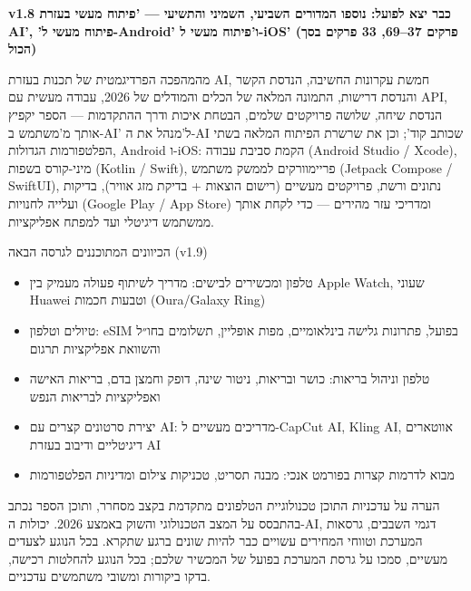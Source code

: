

\textbf{v1.8 כבר יצא לפועל: נוספו המדורים השביעי, השמיני והתשיעי — 'פיתוח מעשי בעזרת AI', 'פיתוח מעשי ל-Android' ו'פיתוח מעשי ל-iOS' (פרקים 37–69, 33 פרקים בסך הכול)}\par

מהמהפכה הפרדיגמטית של תכנות בעזרת AI, חמשת עקרונות החשיבה, הנדסת הקשר והנדסת דרישות, התמונה המלאה של הכלים והמודלים של 2026, עבודה מעשית עם API, הנדסת שיחה, שלושה פרויקטים שלמים, הבטחת איכות ודרך ההתקדמות — הספר יקפיץ אותך מ'משתמש ב-AI' ל'מנהל את ה-AI שכותב קוד'; וכן את שרשרת הפיתוח המלאה בשתי הפלטפורמות הגדולות, Android ו-iOS: הקמת סביבת עבודה (Android Studio / Xcode), מיני-קורס בשפות (Kotlin / Swift), פריימוורקים לממשק משתמש (Jetpack Compose / SwiftUI), נתונים ורשת, פרויקטים מעשיים (רישום הוצאות + בדיקת מזג אוויר), בדיקות ועלייה לחנויות (Google Play / App Store) ומדריכי עזר מהירים — כדי לקחת אותך ממשתמש דיגיטלי ועד למפתח אפליקציות.

\begin{tcbinfo}{הכיוונים המתוכננים לגרסה הבאה (v1.9)}
\begin{itemize}
  \item טלפון ומכשירים לבישים: מדריך לשיתוף פעולה מעמיק בין Apple Watch, שעוני Huawei וטבעות חכמות (Oura/Galaxy Ring)
  \item טיולים וטלפון: eSIM בפועל, פתרונות גלישה בינלאומיים, מפות אופליין, תשלומים בחו״ל והשוואת אפליקציות תרגום
  \item טלפון וניהול בריאות: כושר ובריאות, ניטור שינה, דופק וחמצן בדם, בריאות האישה ואפליקציות לבריאות הנפש
  \item יצירת סרטונים קצרים עם AI: מדריכים מעשיים ל-CapCut AI, Kling AI, אווטארים דיגיטליים ודיבוב בעזרת AI
  \item מבוא לדרמות קצרות בפורמט אנכי: מבנה תסריט, טכניקות צילום ומדיניות הפלטפורמות
\end{itemize}

\end{tcbinfo}

\begin{tcbwarn}{הערה על עדכניות התוכן}
טכנולוגיית הטלפונים מתקדמת בקצב מסחרר, ותוכן הספר נכתב בהתבסס על המצב הטכנולוגי והשוק באמצע 2026. יכולות ה-AI, דגמי השבבים, גרסאות המערכת וטווחי המחירים עשויים כבר להיות שונים ברגע שתקרא. בכל הנוגע לצעדים מעשיים, סמכו על גרסת המערכת בפועל של המכשיר שלכם; בכל הנוגע להחלטות רכישה, בדקו ביקורות ומשובי משתמשים עדכניים.

\end{tcbwarn}
